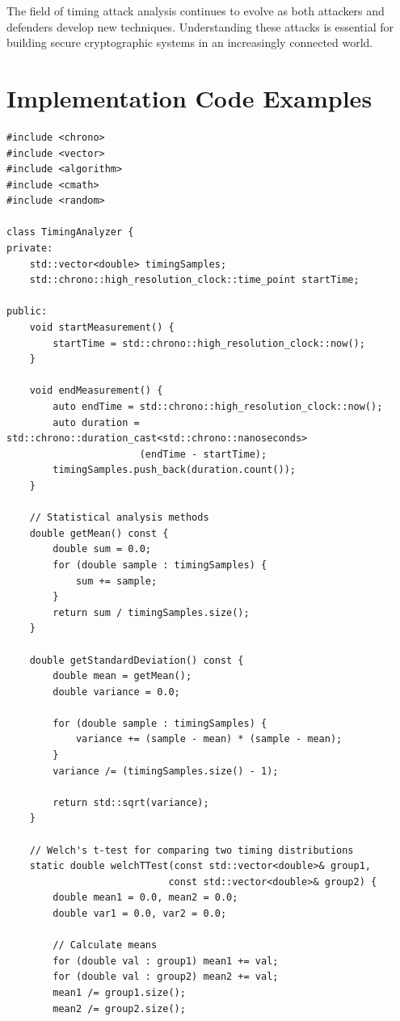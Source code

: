 \documentclass[12pt,a4paper]{article}
\theoremstyle{definition}
\begin{document}
The field of timing attack analysis continues to evolve as both attackers and defenders develop new techniques. Understanding these attacks is essential for building secure cryptographic systems in an increasingly connected world.

\section{Implementation Code Examples}

\begin{lstlisting}[style=cryptoCode, caption={Timing Attack Detection Framework}]
#include <chrono>
#include <vector>
#include <algorithm>
#include <cmath>
#include <random>

class TimingAnalyzer {
private:
    std::vector<double> timingSamples;
    std::chrono::high_resolution_clock::time_point startTime;
    
public:
    void startMeasurement() {
        startTime = std::chrono::high_resolution_clock::now();
    }
    
    void endMeasurement() {
        auto endTime = std::chrono::high_resolution_clock::now();
        auto duration = std::chrono::duration_cast<std::chrono::nanoseconds>
                       (endTime - startTime);
        timingSamples.push_back(duration.count());
    }
    
    // Statistical analysis methods
    double getMean() const {
        double sum = 0.0;
        for (double sample : timingSamples) {
            sum += sample;
        }
        return sum / timingSamples.size();
    }
    
    double getStandardDeviation() const {
        double mean = getMean();
        double variance = 0.0;
        
        for (double sample : timingSamples) {
            variance += (sample - mean) * (sample - mean);
        }
        variance /= (timingSamples.size() - 1);
        
        return std::sqrt(variance);
    }
    
    // Welch's t-test for comparing two timing distributions
    static double welchTTest(const std::vector<double>& group1,
                            const std::vector<double>& group2) {
        double mean1 = 0.0, mean2 = 0.0;
        double var1 = 0.0, var2 = 0.0;
        
        // Calculate means
        for (double val : group1) mean1 += val;
        for (double val : group2) mean2 += val;
        mean1 /= group1.size();
        mean2 /= group2.size();
        

\end{lstlisting}
\end{document}
